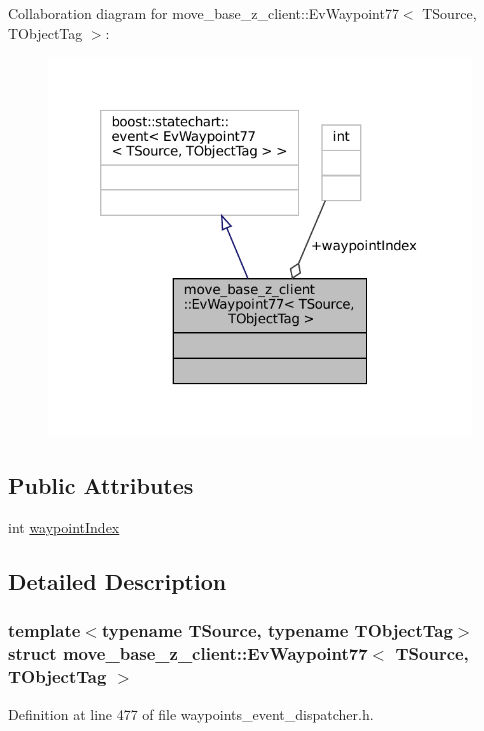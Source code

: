 Collaboration diagram for move\+\_\+base\+\_\+z\+\_\+client\+:\+:Ev\+Waypoint77$<$ T\+Source, T\+Object\+Tag $>$\+:
\nopagebreak
\begin{figure}[H]
\begin{center}
\leavevmode
\includegraphics[width=320pt]{structmove__base__z__client_1_1EvWaypoint77__coll__graph}
\end{center}
\end{figure}
\subsection*{Public Attributes}
\begin{DoxyCompactItemize}
\item 
int \hyperlink{structmove__base__z__client_1_1EvWaypoint77_ac09c33a938a9a15ecc42c4b191b036fb}{waypoint\+Index}
\end{DoxyCompactItemize}


\subsection{Detailed Description}
\subsubsection*{template$<$typename T\+Source, typename T\+Object\+Tag$>$\newline
struct move\+\_\+base\+\_\+z\+\_\+client\+::\+Ev\+Waypoint77$<$ T\+Source, T\+Object\+Tag $>$}



Definition at line 477 of file waypoints\+\_\+event\+\_\+dispatcher.\+h.



